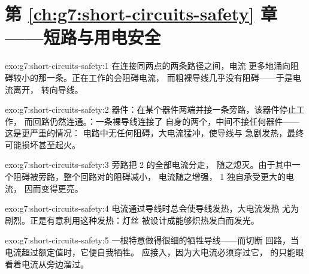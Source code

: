 \section*{第 \ref{ch:g7:short-circuits-safety} 章——短路与用电安全}

\begin{solution}{exo:g7:short-circuits-safety:1}
在连接同两点的两条路径之间，电流
更多地涌向阻碍较小的那一条。正在工作的会阻碍电流，
而粗裸导线几乎没有阻碍——于是电流离开，
转向导线。
\end{solution}

\begin{solution}{exo:g7:short-circuits-safety:2}
器件：在某个器件两端并接一条旁路，该器件停止工作，
而回路仍然连通。：一条裸导线连接了
自身的两个，中间不接任何器件——这是更严重的情况：
电路中无任何阻碍，大电流猛冲，使导线与
急剧发热，最终可能损坏甚至起火。
\end{solution}

\begin{solution}{exo:g7:short-circuits-safety:3}
旁路把 2 的全部电流分走，
随之熄灭。由于其中一个阻碍被旁路，整个回路对的阻碍减小，
电流随之增强， 1 独自承受更大的电流，
因而变得更亮。
\end{solution}

\begin{solution}{exo:g7:short-circuits-safety:4}
电流通过导线时总会使导线发热，大电流发热
尤为剧烈。正是有意利用这种发热：灯丝
被设计成能够炽热发白而发光。
\end{solution}

\begin{solution}{exo:g7:short-circuits-safety:5}
一根特意做得很细的牺牲导线——而切断
回路，当电流超过额定值时，它便自我牺牲。
应接入，因为大电流必须穿过它，
的只能眼看着电流从旁边溜过。
\end{solution}


